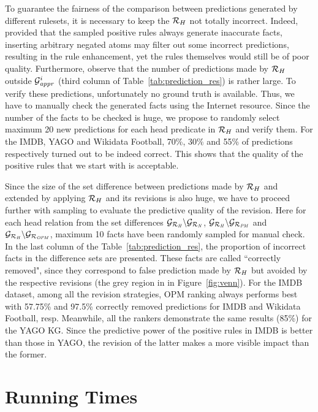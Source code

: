 To guarantee the fairness of the comparison between predictions generated by different rulesets, it is necessary to keep the $\mathcal{R}_H$ not totally incorrect. Indeed, provided that the sampled positive rules always generate inaccurate facts, inserting arbitrary negated atoms may filter out some incorrect predictions, resulting in the rule enhancement, yet the rules themselves would still be of poor quality. Furthermore, observe that the number of predictions made by $\mathcal{R}_H$ outside $\mathcal{G}^i_{\mathit{appr}}$ (third column of Table~\ref{tab:prediction_res}) is rather large. To verify these predictions, unfortunately no ground truth is available. Thus, we have to manually check the generated facts using the Internet resource. Since the number of the facts to be checked is huge, we propose to randomly select maximum 20 new predictions for each head predicate in $\mathcal{R}_H$ and verify them. For the IMDB, YAGO and Wikidata Football, 70\%, 30\% and 55\% of predictions respectively turned out to be indeed correct. This shows that the quality of the positive rules that we start with is acceptable.

Since the size of the set difference between predictions made by $\mathcal{R}_H$ and extended by applying $\mathcal{R}_H$ and its revisions is also huge, we have to proceed further with sampling to evaluate the predictive quality of the revision. Here for each head relation from the set differences $\mathcal{G}_{\mathcal{R}_{\mathit{H}}}\backslash \mathcal{G}_{\mathcal{R}_{\mathit{N}}}$, $\mathcal{G}_{\mathcal{R}_{\mathit{H}}}\backslash \mathcal{G}_{\mathcal{R}_{\mathit{PM}}}$ and $\mathcal{G}_{\mathcal{R}_{\mathit{H}}}\backslash \mathcal{G}_{\mathcal{R}_{\mathit{OPM}}}$, maximum 10 facts have been randomly sampled for manual check. In the last column of the Table~\ref{tab:prediction_res}, the proportion of incorrect facts in the difference sets are presented. These facts are called ``correctly removed", since they correspond to false prediction made by $\mathcal{R}_H$ but avoided by the respective revisions (the grey region in in Figure~\ref{fig:venn}). For the IMDB dataset, among all the revision strategies, OPM ranking always performs best with 57.75\% and 97.5\% correctly removed predictions for IMDB and Wikidata Football, resp. Meanwhile, all the rankers demonstrate the same results (85\%) for the YAGO KG. Since the predictive power of the positive rules in IMDB is better than those in YAGO, the revision of the latter makes a more visible impact than the former.

\section{Running Times}

